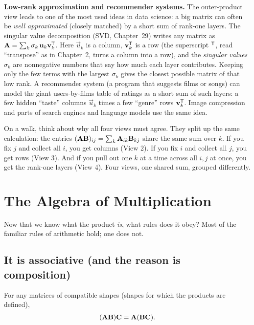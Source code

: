 \begin{applicationbox}
\textbf{Low-rank approximation and recommender systems.} The outer-product view leads
to one of the most used ideas in data science: a big matrix can often be
\emph{well approximated} (closely matched) by a short sum of rank-one layers. The singular value
decomposition (SVD, Chapter~29) writes any matrix as
$\mathbf{A} = \sum_k \sigma_k\, \mathbf{u}_k \mathbf{v}_k^{\mathsf{T}}$. Here $\vec{u}_k$ is a column,
$\mathbf{v}_k^{\mathsf{T}}$ is a row (the superscript $^{\mathsf{T}}$, read ``transpose'' as in Chapter~2, turns a
column into a row), and the \emph{singular values} $\sigma_k$ are nonnegative numbers that say how much
each layer contributes. Keeping only the few terms with the largest $\sigma_k$ gives the
closest possible matrix of that low rank. A recommender system (a program that suggests
films or songs) can model the giant users-by-films table of ratings as a short sum of
such layers: a few hidden ``taste'' columns $\vec{u}_k$ times a few ``genre'' rows
$\mathbf{v}_k^{\mathsf{T}}$. Image compression and parts of search engines and language models use
the same idea.
\end{applicationbox}

\begin{walkbox}
On a walk, think about why all four views must agree. They split up the same calculation:
the entries $(\mathbf{A}\mathbf{B})_{ij} = \sum_k \mathbf{A}_{ik}\mathbf{B}_{kj}$ share the same
sum over $k$. If you fix $j$ and collect all $i$, you get columns (View 2). If you fix
$i$ and collect all $j$, you get rows (View 3). And if you pull out one $k$ at a time across all $i,j$ at
once, you get the rank-one layers (View 4). Four views, one shared sum, grouped
differently.
\end{walkbox}

\section{The Algebra of Multiplication}
\label{ch08:algebra}

Now that we know what the product \emph{is}, what rules does it obey? Most of the
familiar rules of arithmetic hold; one does not.

\subsection{It is associative (and the reason is composition)}

\begin{theorem}[Associativity]
\label{ch08:assoc}
For any matrices of compatible shapes (shapes for which the products are defined),
\[
(\mathbf{A}\mathbf{B})\mathbf{C} = \mathbf{A}(\mathbf{B}\mathbf{C}).
\]
\end{theorem}

